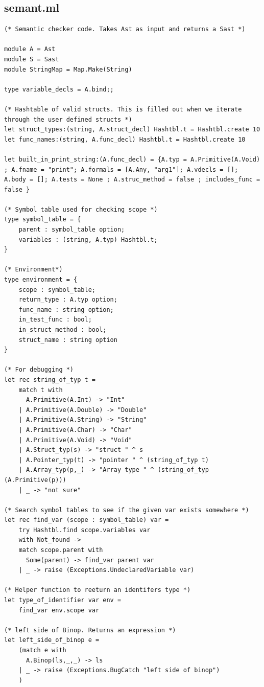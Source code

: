 \documentclass{article}
\begin{document}
\newpage
\subsection{semant.ml}

\begin{lstlisting}
(* Semantic checker code. Takes Ast as input and returns a Sast *)

module A = Ast
module S = Sast
module StringMap = Map.Make(String)

type variable_decls = A.bind;;

(* Hashtable of valid structs. This is filled out when we iterate through the user defined structs *)
let struct_types:(string, A.struct_decl) Hashtbl.t = Hashtbl.create 10
let func_names:(string, A.func_decl) Hashtbl.t = Hashtbl.create 10

let built_in_print_string:(A.func_decl) = {A.typ = A.Primitive(A.Void) ; A.fname = "print"; A.formals = [A.Any, "arg1"]; A.vdecls = []; A.body = []; A.tests = None ; A.struc_method = false ; includes_func = false }

(* Symbol table used for checking scope *)
type symbol_table = {
	parent : symbol_table option;
	variables : (string, A.typ) Hashtbl.t;
}

(* Environment*)
type environment = {
	scope : symbol_table;
	return_type : A.typ option;
	func_name : string option;
	in_test_func : bool;
	in_struct_method : bool;
	struct_name : string option
}

(* For debugging *)
let rec string_of_typ t =
	match t with
	  A.Primitive(A.Int) -> "Int"
	| A.Primitive(A.Double) -> "Double"
	| A.Primitive(A.String) -> "String"
	| A.Primitive(A.Char) -> "Char"
	| A.Primitive(A.Void) -> "Void"
	| A.Struct_typ(s) -> "struct " ^ s
	| A.Pointer_typ(t) -> "pointer " ^ (string_of_typ t)
	| A.Array_typ(p,_) -> "Array type " ^ (string_of_typ (A.Primitive(p)))
	| _ -> "not sure"

(* Search symbol tables to see if the given var exists somewhere *)
let rec find_var (scope : symbol_table) var =
	try Hashtbl.find scope.variables var
	with Not_found ->
	match scope.parent with
	  Some(parent) -> find_var parent var
	| _ -> raise (Exceptions.UndeclaredVariable var)	

(* Helper function to reeturn an identifers type *)
let type_of_identifier var env = 
	find_var env.scope var

(* left side of Binop. Returns an expression *)
let left_side_of_binop e =
	(match e with 
	  A.Binop(ls,_,_) -> ls
	| _ -> raise (Exceptions.BugCatch "left side of binop")
	)


\end{lstlisting}
\end{document}
